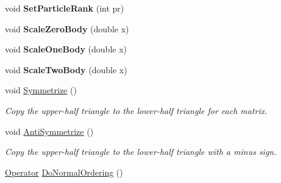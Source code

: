 \begin{DoxyCompactItemize}
\item 
\hypertarget{classOperator_a77eb97b1309a1c4e20101217903b9771}{void {\bfseries Set\-Particle\-Rank} (int pr)}\label{classOperator_a77eb97b1309a1c4e20101217903b9771}

\item 
\hypertarget{classOperator_a3a25803bc77344396f2dd0e75d2a020d}{void {\bfseries Scale\-Zero\-Body} (double x)}\label{classOperator_a3a25803bc77344396f2dd0e75d2a020d}

\item 
\hypertarget{classOperator_a5466cc965277b75b14b60918f4d652ab}{void {\bfseries Scale\-One\-Body} (double x)}\label{classOperator_a5466cc965277b75b14b60918f4d652ab}

\item 
\hypertarget{classOperator_af1f244c4856d11c21f94b6c6cd24a555}{void {\bfseries Scale\-Two\-Body} (double x)}\label{classOperator_af1f244c4856d11c21f94b6c6cd24a555}

\item 
\hypertarget{classOperator_a98d4075d734523186162492a4a45b420}{void \hyperlink{classOperator_a98d4075d734523186162492a4a45b420}{Symmetrize} ()}\label{classOperator_a98d4075d734523186162492a4a45b420}

\begin{DoxyCompactList}\small\item\em Copy the upper-\/half triangle to the lower-\/half triangle for each matrix. \end{DoxyCompactList}\item 
\hypertarget{classOperator_a21a37daa051c248109153e6502b8280f}{void \hyperlink{classOperator_a21a37daa051c248109153e6502b8280f}{Anti\-Symmetrize} ()}\label{classOperator_a21a37daa051c248109153e6502b8280f}

\begin{DoxyCompactList}\small\item\em Copy the upper-\/half triangle to the lower-\/half triangle with a minus sign. \end{DoxyCompactList}\item 
\hypertarget{classOperator_a622880b91a902c832b867c6447a262e7}{\hyperlink{classOperator}{Operator} \hyperlink{classOperator_a622880b91a902c832b867c6447a262e7}{Do\-Normal\-Ordering} ()}\label{classOperator_a622880b91a902c832b867c6447a262e7}


\end{DoxyCompactItemize}
